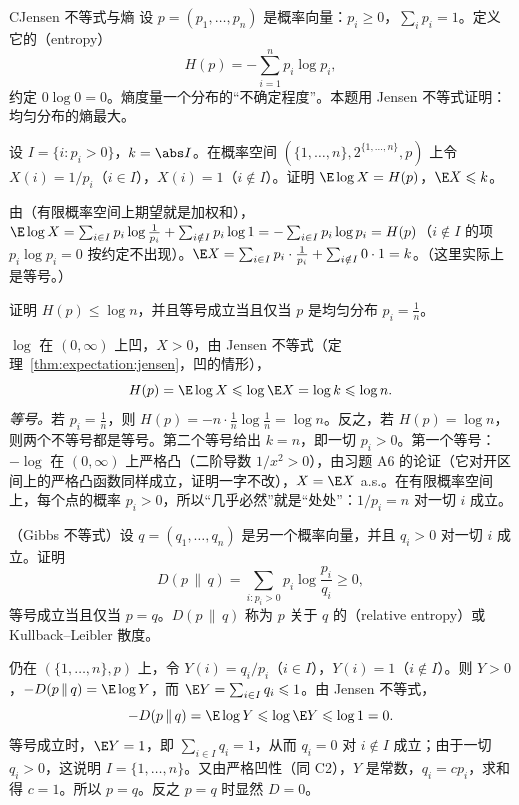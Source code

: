 \begin{probleme}{C}{Jensen 不等式与熵}
设 $p=(p_1,\dots,p_n)$ 是概率向量：$p_i\geqslant0$，$\sum_ip_i=1$。定义它的（entropy）
\[
H(p)=-\sum_{i=1}^np_i\log p_i,
\]
约定 $0\log0=0$。熵度量一个分布的“不确定程度”。本题用 Jensen 不等式证明：均匀分布的熵最大。
\begin{questions}
\item 设 $I=\{i:p_i>0\}$，$k=\abs I$。在概率空间 $(\{1,\dots,n\},2^{\{1,\dots,n\}},p)$ 上令 $X(i)=1/p_i$（$i\in I$），$X(i)=1$（$i\notin I$）。证明 $\E\log X=H(p)$，$\E X\leqslant k$。
\begin{solution}
由（有限概率空间上期望就是加权和），$\E\log X=\sum_{i\in I}p_i\log\frac1{p_i}+\sum_{i\notin I}p_i\log1=-\sum_{i\in I}p_i\log p_i=H(p)$（$i\notin I$ 的项 $p_i\log p_i=0$ 按约定不出现）。$\E X=\sum_{i\in I}p_i\cdot\frac1{p_i}+\sum_{i\notin I}0\cdot1=k$。（这里实际上是等号。）
\end{solution}

\item 证明 $H(p)\leqslant\log n$，并且等号成立当且仅当 $p$ 是均匀分布 $p_i=\frac1n$。
\begin{solution}
$\log$ 在 $(0,\infty)$ 上凹，$X>0$，由 Jensen 不等式（定理~\ref{thm:expectation:jensen}，凹的情形），
\[
H(p)=\E\log X\leqslant\log \E X=\log k\leqslant\log n .
\]
\emph{等号。}若 $p_i=\frac1n$，则 $H(p)=-n\cdot\frac1n\log\frac1n=\log n$。反之，若 $H(p)=\log n$，则两个不等号都是等号。第二个等号给出 $k=n$，即一切 $p_i>0$。第一个等号：$-\log$ 在 $(0,\infty)$ 上严格凸（二阶导数 $1/x^2>0$），由习题 A6 的论证（它对开区间上的严格凸函数同样成立，证明一字不改），$X=\E X$ a.s.。在有限概率空间上，每个点的概率 $p_i>0$，所以“几乎必然”就是“处处”：$1/p_i=n$ 对一切 $i$ 成立。
\end{solution}

\item （Gibbs 不等式）设 $q=(q_1,\dots,q_n)$ 是另一个概率向量，并且 $q_i>0$ 对一切 $i$ 成立。证明
\[
D(p\,\|\,q)=\sum_{i:p_i>0}p_i\log\frac{p_i}{q_i}\geqslant0,
\]
等号成立当且仅当 $p=q$。$D(p\,\|\,q)$ 称为 $p$ 关于 $q$ 的（relative entropy）或 Kullback--Leibler 散度。
\begin{solution}
仍在 $(\{1,\dots,n\},p)$ 上，令 $Y(i)=q_i/p_i$（$i\in I$），$Y(i)=1$（$i\notin I$）。则 $Y>0$，$-D(p\,\|\,q)=\E\log Y$，而 $\E Y=\sum_{i\in I}q_i\leqslant1$。由 Jensen 不等式，
\[
-D(p\,\|\,q)=\E\log Y\leqslant\log \E Y\leqslant\log1=0 .
\]
等号成立时，$\E Y=1$，即 $\sum_{i\in I}q_i=1$，从而 $q_i=0$ 对 $i\notin I$ 成立；由于一切 $q_i>0$，这说明 $I=\{1,\dots,n\}$。又由严格凹性（同 C2），$Y$ 是常数，$q_i=cp_i$，求和得 $c=1$。所以 $p=q$。反之 $p=q$ 时显然 $D=0$。


\end{solution}
\end{questions}
\end{probleme}
